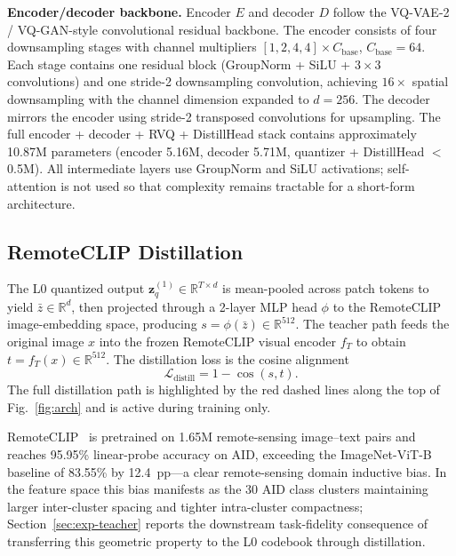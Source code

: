 \documentclass[lettersize,journal]{IEEEtran}
\begin{document}
\textbf{Encoder/decoder backbone.} Encoder $E$ and decoder $D$ follow the VQ-VAE-2 / VQ-GAN-style convolutional residual backbone. The encoder consists of four downsampling stages with channel multipliers $[1,2,4,4]\times C_{\mathrm{base}}$, $C_{\mathrm{base}}=64$. Each stage contains one residual block (GroupNorm + SiLU + $3{\times}3$ convolutions) and one stride-2 downsampling convolution, achieving $16\times$ spatial downsampling with the channel dimension expanded to $d=256$. The decoder mirrors the encoder using stride-2 transposed convolutions for upsampling. The full encoder + decoder + RVQ + DistillHead stack contains approximately 10.87M parameters (encoder 5.16M, decoder 5.71M, quantizer + DistillHead $<$0.5M). All intermediate layers use GroupNorm and SiLU activations; self-attention is not used so that complexity remains tractable for a short-form architecture.

\subsection{RemoteCLIP Distillation}
\label{sec:method-distill}

The L0 quantized output $\mathbf{z}_q^{(1)}\in\mathbb{R}^{T\times d}$ is mean-pooled across patch tokens to yield $\bar{z}\in\mathbb{R}^{d}$, then projected through a 2-layer MLP head $\phi$ to the RemoteCLIP image-embedding space, producing $s = \phi(\bar{z})\in\mathbb{R}^{512}$. The teacher path feeds the original image $x$ into the frozen RemoteCLIP visual encoder $f_T$ to obtain $t = f_T(x)\in\mathbb{R}^{512}$. The distillation loss is the cosine alignment
\begin{equation}
\mathcal{L}_{\mathrm{distill}} = 1 - \cos(s, t).
\end{equation}
The full distillation path is highlighted by the red dashed lines along the top of Fig.~\ref{fig:arch} and is active during training only.

RemoteCLIP~\cite{liu2024remoteclip} is pretrained on 1.65M remote-sensing image--text pairs and reaches 95.95\% linear-probe accuracy on AID, exceeding the ImageNet-ViT-B baseline of 83.55\% by 12.4~pp---a clear remote-sensing domain inductive bias. In the feature space this bias manifests as the 30 AID class clusters maintaining larger inter-cluster spacing and tighter intra-cluster compactness; Section~\ref{sec:exp-teacher} reports the downstream task-fidelity consequence of transferring this geometric property to the L0 codebook through distillation.
\end{document}
